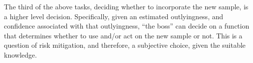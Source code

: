 \documentclass{article}
\begin{document}
The third of the above tasks, deciding whether to incorporate the new sample, is a higher level decision.  Specifically, given an estimated outlyingness, and confidence associated with that outlyingness, ``the boss'' can decide on a function that determines whether to use and/or act on the new sample or not.  This is a question of risk mitigation, and therefore, a subjective choice, given the suitable knowledge.






\clearpage
\appendix


\begin{comment}

\section{LifeLong Learning Forests}

Here, we demonstrate how lifelong learning forests (L2F) can be developed into the first and only universal lifelong learning machines, that is, lifelong learning machines that achieve optimal performance over any distributional assumptions.

In the subsequent chapters,  for each of the five components of lifelong learning, we provide:
\begin{enumerate}
    \item our proposal for how lifelong learning forests can achieve efficiency, and in which contexts,
    \item a set of baseline algorithms, and
    \item a set of challenge problems
\end{enumerate}

\subsection{Continual Learning}

Our Continual Lifelong Learning Forest will be based on the following.  Recent work demonstrated that a certain class of decision trees is minimax optimal, meaning that the worst risk it achieves over all distributions $P \in \mathcal{P}$ is the smallest possible over all decision functions $\phi \in \Phi$~\cite{Scott2006-oo}.  This is achieved by writing down the solution to finding the best decision tree as a penalized optimization problem, where the penalty corresponds to the tree complexity (not just the tree depth)~\cite{Scott2005-ho}. In other work, a dual averaging method for regularized online learning was demonstrated to be effective~\cite{Xiao2010-gv}, which can be applied to learning the trees. Therefore, we propose to combine these two approaches to build collections optimal trees online, which we will combine into a single forest. 


\end{comment}
\end{document}
